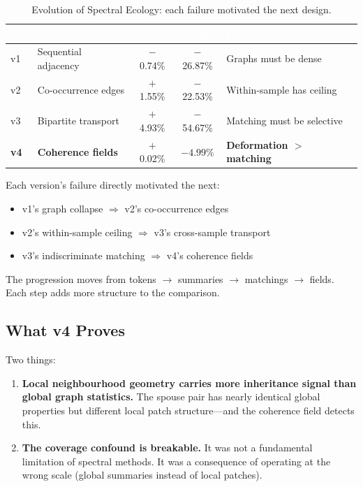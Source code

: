 \documentclass{../yalumba}
\begin{document}
\begin{table}[H]
  \centering
  \tablestyle
  \caption{Evolution of Spectral Ecology: each failure motivated the next design.}
  \label{tab:arc}
  \begin{tabular}{llccl}
    \toprule
    \rowcolor{table-header}
    \textcolor{white}{\textbf{Ver}} &
    \textcolor{white}{\textbf{Innovation}} &
    \textcolor{white}{\textbf{Sep}} &
    \textcolor{white}{\textbf{Gap}} &
    \textcolor{white}{\textbf{Lesson}} \\
    \midrule
    v1 & Sequential adjacency & $-$0.74\% & $-$26.87\% & Graphs must be dense \\
    v2 & Co-occurrence edges & $+$1.55\% & $-$22.53\% & Within-sample has ceiling \\
    v3 & Bipartite transport & $+$4.93\% & $-$54.67\% & Matching must be selective \\
    \textbf{v4} & \textbf{Coherence fields} & $+$0.02\% & $\mathbf{-4.99\%}$ & \textbf{Deformation $>$ matching} \\
    \bottomrule
  \end{tabular}
\end{table}

Each version's failure directly motivated the next:
\begin{itemize}
  \item v1's graph collapse $\Rightarrow$ v2's co-occurrence edges
  \item v2's within-sample ceiling $\Rightarrow$ v3's cross-sample transport
  \item v3's indiscriminate matching $\Rightarrow$ v4's coherence fields
\end{itemize}

The progression moves from tokens $\to$ summaries $\to$ matchings $\to$ fields.
Each step adds more structure to the comparison.

\subsection{What v4 Proves}

Two things:

\begin{enumerate}
  \item \textbf{Local neighbourhood geometry carries more inheritance signal
    than global graph statistics.}  The spouse pair has nearly identical
    global properties but different local patch structure---and the coherence
    field detects this.
  \item \textbf{The coverage confound is breakable.}  It was not a fundamental
    limitation of spectral methods.  It was a consequence of operating at the
    wrong scale (global summaries instead of local patches).
\end{enumerate}
\end{document}
